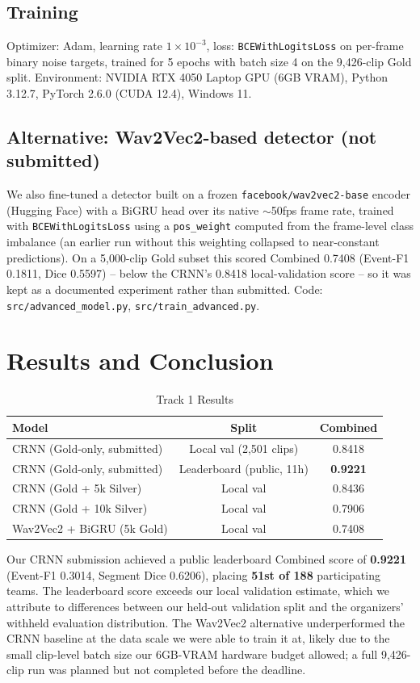 \documentclass[conference]{IEEEtran}
\begin{document}
\subsection{Training}
Optimizer: Adam, learning rate $1\times10^{-3}$, loss:
\texttt{BCEWithLogitsLoss} on per-frame binary noise targets, trained for 5
epochs with batch size 4 on the 9{,}426-clip Gold split. Environment: NVIDIA
RTX 4050 Laptop GPU (6GB VRAM), Python 3.12.7, PyTorch 2.6.0 (CUDA 12.4),
Windows 11.

\subsection{Alternative: Wav2Vec2-based detector (not submitted)}
We also fine-tuned a detector built on a frozen \texttt{facebook/wav2vec2-base}
encoder (Hugging Face) with a BiGRU head over its native $\sim$50fps frame
rate, trained with \texttt{BCEWithLogitsLoss} using a \texttt{pos\_weight}
computed from the frame-level class imbalance (an earlier run without this
weighting collapsed to near-constant predictions). On a 5{,}000-clip Gold
subset this scored Combined 0.7408 (Event-F1 0.1811, Dice 0.5597) --
below the CRNN's 0.8418 local-validation score -- so it was kept as a
documented experiment rather than submitted. Code:
\texttt{src/advanced\_model.py}, \texttt{src/train\_advanced.py}.

\section{Results and Conclusion}

\begin{table}[h]
\centering
\caption{Track 1 Results}
\begin{tabular}{lcc}
\toprule
\textbf{Model} & \textbf{Split} & \textbf{Combined} \\
\midrule
CRNN (Gold-only, submitted) & Local val (2,501 clips) & 0.8418 \\
CRNN (Gold-only, submitted) & Leaderboard (public, 11h) & \textbf{0.9221} \\
CRNN (Gold + 5k Silver) & Local val & 0.8436 \\
CRNN (Gold + 10k Silver) & Local val & 0.7906 \\
Wav2Vec2 + BiGRU (5k Gold) & Local val & 0.7408 \\
\bottomrule
\end{tabular}
\end{table}

Our CRNN submission achieved a public leaderboard Combined score of
\textbf{0.9221} (Event-F1 0.3014, Segment Dice 0.6206), placing
\textbf{51st of 188} participating teams. The leaderboard score exceeds our
local validation estimate, which we attribute to differences between our
held-out validation split and the organizers' withheld evaluation
distribution. The Wav2Vec2 alternative underperformed the CRNN baseline at
the data scale we were able to train it at, likely due to the small
clip-level batch size our 6GB-VRAM hardware budget allowed; a full
9{,}426-clip run was planned but not completed before the deadline.
\end{document}
